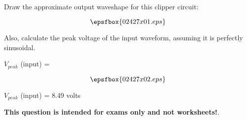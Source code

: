 

Draw the approximate output waveshape for this clipper circuit:

$$\epsfbox{02427x01.eps}$$

Also, calculate the peak voltage of the input waveform, assuming it is perfectly sinusoidal.

\vskip 5pt

$V_{peak}$ (input) = 







$$\epsfbox{02427x02.eps}$$

$V_{peak}$ (input) = 8.49 volts







{\bf This question is intended for exams only and not worksheets!}.




